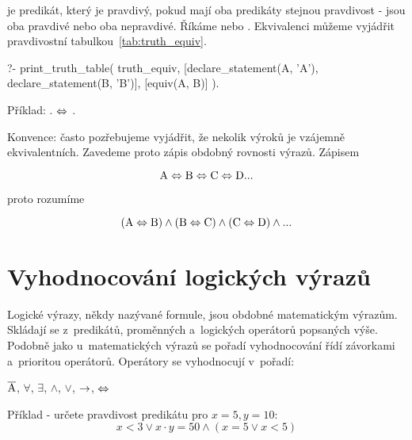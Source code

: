 je predikát, který je pravdivý, pokud mají oba predikáty stejnou pravdivost - jsou oba pravdivé nebo oba nepravdivé. Říkáme  nebo .
Ekvivalenci můžeme vyjádřit pravdivostní tabulkou~\ref{tab:truth_equiv}.

\begin{prolog}
?- print_truth_table(
	truth_equiv,
	[declare_statement(A, 'A'), declare_statement(B, 'B')],
	[equiv(A, B)]
).
\end{prolog}

Příklad: .  \(\Leftrightarrow\) .

Konvence: často pozřebujeme vyjádřit, že nekolik výroků je vzájemně ekvivalentních. Zavedeme proto zápis obdobný rovnosti výrazů. Zápisem

\begin{equation}
\mathrm{A} \Leftrightarrow \mathrm{B} \Leftrightarrow \mathrm{C} \Leftrightarrow \mathrm{D} ... 
\end{equation}

proto rozumíme

\begin{equation}
(\mathrm{A} \Leftrightarrow \mathrm{B}) \land (\mathrm{B} \Leftrightarrow \mathrm{C}) \land (\mathrm{C} \Leftrightarrow \mathrm{D}) \land ... 
\end{equation}

\section{Vyhodnocování logických výrazů}

Logické výrazy, někdy nazývané formule, jsou obdobné matematickým výrazům. Skládají se z~predikátů, proměnných a~logických operátorů popsaných výše. Podobně jako u~matematických výrazů se pořadí vyhodnocování řídí závorkami a~prioritou operátorů. Operátory se vyhodnocují v~pořadí:

\(\overline{\mathrm{A}}\), \(\forall\), \(\exists\), \(\land\), \(\lor\), \(\rightarrow\), \(\Leftrightarrow\)

Příklad - určete pravdivost predikátu pro \(x = 5, y = 10\):
\begin{equation}
x < 3 \lor x \cdot y = 50 \land (x = 5 \lor x < 5)
\end{equation}

